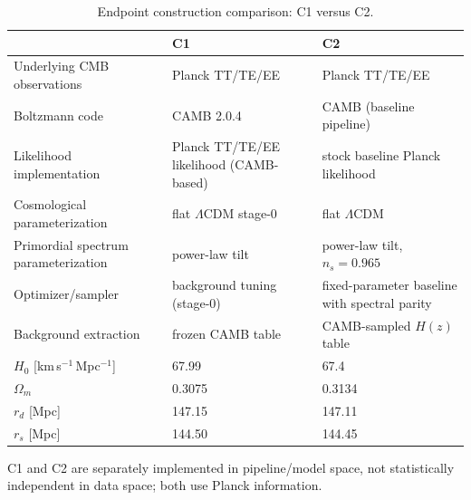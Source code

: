 \begin{table}[!htbp]
  \centering
  \caption{Endpoint construction comparison: C1 versus C2.}
  \label{tab:endpoint-construction}
  {\small
  \begin{tabularx}{\linewidth}{lXX}
    \toprule
     & C1 & C2 \\
    \midrule
    Underlying CMB observations & Planck TT/TE/EE & Planck TT/TE/EE \\
    Boltzmann code & CAMB 2.0.4 & CAMB (baseline pipeline) \\
    Likelihood implementation & Planck TT/TE/EE likelihood (CAMB-based) &
      stock baseline Planck likelihood \\
    Cosmological parameterization & flat $\Lambda$CDM stage-0 &
      flat $\Lambda$CDM \\
    Primordial spectrum parameterization & power-law tilt &
      power-law tilt, $n_{s}=0.965$ \\
    Optimizer/sampler & background tuning (stage-0) &
      fixed-parameter baseline with spectral parity \\
    Background extraction & frozen CAMB table &
      CAMB-sampled $H(z)$ table \\
    $H_{0}$ [km\,s$^{-1}$\,Mpc$^{-1}$] & 67.99 & 67.4 \\
    $\Omega_{m}$ & 0.3075 & 0.3134 \\
    $r_{d}$ [Mpc] & 147.15 & 147.11 \\
    $r_{s}$ [Mpc] & 144.50 & 144.45 \\
    \bottomrule
  \end{tabularx}
  }
\end{table}

C1 and C2 are separately implemented in pipeline/model space,
not statistically independent in data space; both use Planck
information.
